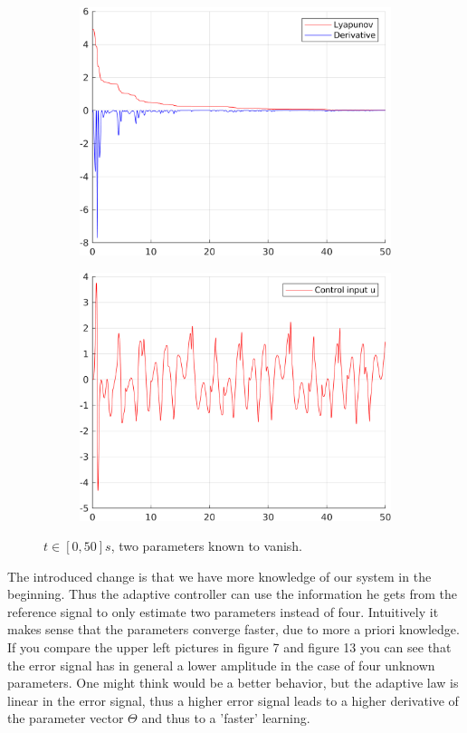 \documentclass[12pt,a4paper]{article}
\begin{document}
\begin{figure}[H]
\begin{subfigure}{.45\textwidth}
			\includegraphics[width=1\textwidth]{Graphics/NonLinearLyapunovZero3.png}
		\end{subfigure}%
		\begin{subfigure}{.45\textwidth}
			\centering
			\includegraphics[width=1\textwidth]{Graphics/NonLinearControlZero3.png}
		\end{subfigure}
		\caption{$t \in [0,50]s$, two parameters known to vanish.}
	\end{figure}
	The introduced change is that we have more knowledge of our system in the beginning. Thus the adaptive controller can use the information he gets from the reference signal to only estimate two parameters instead of four. Intuitively it makes sense that the parameters converge faster, due to more a priori knowledge.
	If you compare the upper left pictures in figure 7 and figure 13 you can see that the error signal has in general a lower amplitude in the case of four unknown parameters. One might think would be a better behavior, but the adaptive law is linear in the error signal, thus a higher error signal leads to a higher derivative 
	of the parameter vector $\Theta$ and thus to a 'faster' learning.\\
	\newpage
\end{document}
